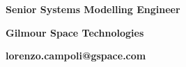 \documentclass[12pt]{article}
\begin{document}
\vspace*{-1.0cm}

\hspace*{9.0cm}\textbf{Senior Systems Modelling Engineer}

\hspace*{9.0cm}\textbf{Gilmour Space Technologies}

\hspace*{9.0cm}\textbf{lorenzo.campoli@gspace.com}



\end{document}
